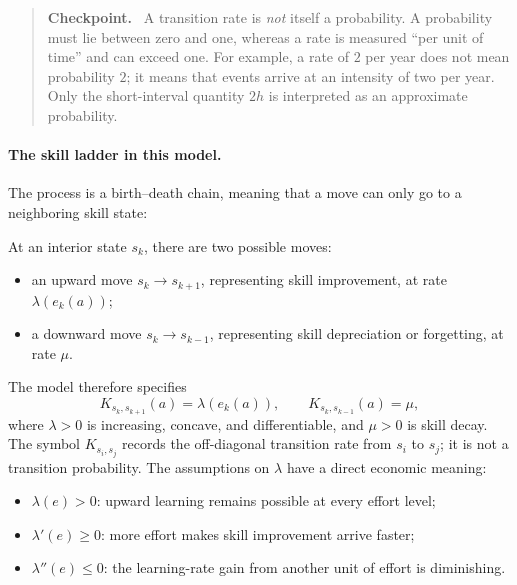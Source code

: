 \documentclass[11pt]{article}
\theoremstyle{tutorial}
\theoremstyle{remark}
\newenvironment{checkpoint}{\begin{quote}\color{rose}\textbf{Checkpoint.}\ }{\end{quote}}
\newcommand{\1}{\mathbb{I}}
\begin{document}
\begin{checkpoint}
A transition rate is \emph{not} itself a probability.  A probability must lie between zero and one, whereas
a rate is measured ``per unit of time'' and can exceed one.  For example, a rate of $2$ per year does not
mean probability $2$; it means that events arrive at an intensity of two per year.  Only the short-interval
quantity $2h$ is interpreted as an approximate probability.
\end{checkpoint}

\paragraph{The skill ladder in this model.}
The process is a birth--death chain, meaning that a move can only go to a neighboring skill state:
\begin{center}
\end{center}
At an interior state $s_k$, there are two possible moves:
\begin{itemize}
  \item an upward move $s_k\to s_{k+1}$, representing skill improvement, at rate
  $\lambda(e_k(a))$;
  \item a downward move $s_k\to s_{k-1}$, representing skill depreciation or forgetting, at rate $\mu$.
\end{itemize}
The model therefore specifies
\[
  K_{s_k,s_{k+1}}(a)=\lambda(e_k(a)),
  \qquad K_{s_k,s_{k-1}}(a)=\mu,
\]
where $\lambda>0$ is increasing, concave, and differentiable, and $\mu>0$ is skill decay.  The symbol
$K_{s_i,s_j}$ records the off-diagonal transition rate from $s_i$ to $s_j$; it is not a transition
probability.  The assumptions on $\lambda$ have a direct economic meaning:
\begin{itemize}
  \item $\lambda(e)>0$: upward learning remains possible at every effort level;
  \item $\lambda'(e)\ge0$: more effort makes skill improvement arrive faster;
  \item $\lambda''(e)\le0$: the learning-rate gain from another unit of effort is diminishing.
\end{itemize}
\end{document}
